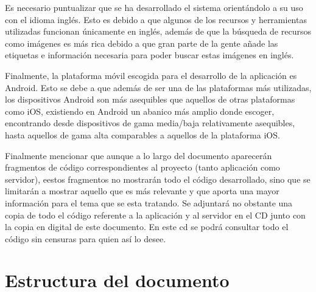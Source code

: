Es necesario puntualizar que se ha desarrollado el sistema orientándolo a su uso con el idioma inglés. Esto es debido a que algunos de los recursos y herramientas utilizadas funcionan únicamente en inglés, además de que la búsqueda de recursos como imágenes es más rica debido a que gran parte de la gente añade las etiquetas e información necesaria para poder buscar estas imágenes en inglés.

Finalmente, la plataforma móvil escogida para el desarrollo de la aplicación es Android. Esto se debe a que además de ser una de las plataformas más utilizadas, los dispositivos Android son más asequibles que aquellos de otras plataformas como iOS, existiendo en Android un abanico más amplio donde escoger, encontrando desde dispositivos de gama media/baja relativamente asequibles, hasta aquellos de gama alta comparables a aquellos de la plataforma iOS.

Finalmente mencionar que aunque a lo largo del documento aparecerán fragmentos de código correspondientes al proyecto (tanto aplicación como servidor), eestos fragmentos no mostrarán todo el código desarrollado, sino que se limitarán a mostrar aquello que es más relevante y que aporta una mayor información para el tema que se esta tratando. Se adjuntará no obstante una copia de todo el código referente a la aplicación y al servidor en el CD junto con la copia en digital de este documento. En este cd se podrá consultar todo el código sin censuras para quien así lo desee.


\section{Estructura del documento}

